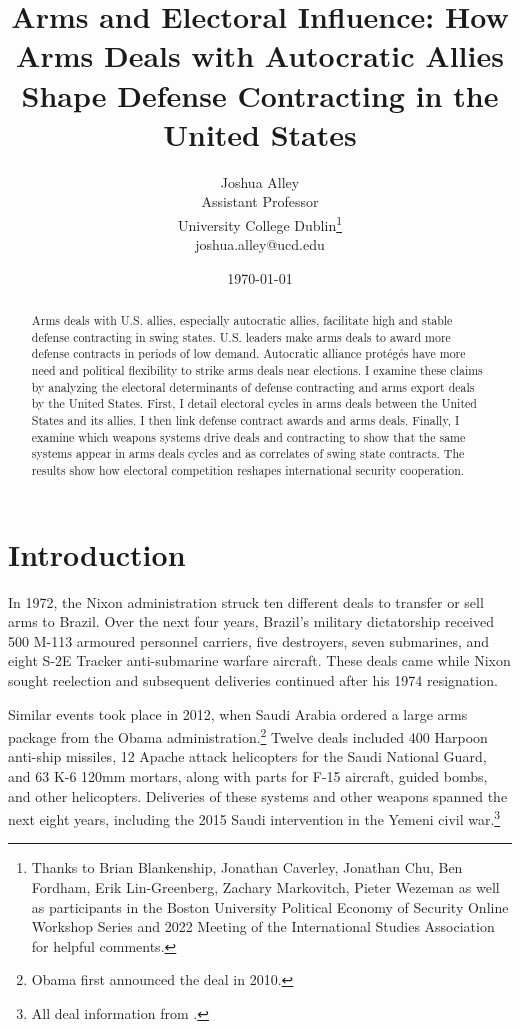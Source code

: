 \documentclass[12pt]{article}
\title{\textbf{Arms and Electoral Influence: How Arms Deals with Autocratic Allies Shape Defense Contracting in the United States}}
\author{Joshua Alley \\
Assistant Professor \\
University College Dublin\thanks{Thanks to Brian Blankenship, Jonathan Caverley, Jonathan Chu, Ben Fordham, Erik Lin-Greenberg, Zachary Markovitch, Pieter Wezeman as well as participants in the Boston University Political Economy of Security Online Workshop Series and 2022 Meeting of the International Studies Association for helpful comments.} \\
joshua.alley@ucd.edu
}
\date{\today}
\begin{document}
\maketitle 

\begin{abstract} 
Arms deals with U.S. allies, especially autocratic allies, facilitate high and stable defense contracting in swing states. 
U.S. leaders make arms deals to award more defense contracts in periods of low demand.
Autocratic alliance prot{\'e}g{\'e}s have more need and political flexibility to strike arms deals near elections. 
I examine these claims by analyzing the electoral determinants of defense contracting and arms export deals by the United States.  
First, I detail electoral cycles in arms deals between the United States and its allies. 
I then link defense contract awards and arms deals.
Finally, I examine which weapons systems drive deals and contracting to show that the same systems appear in arms deals cycles and as correlates of swing state contracts.  
The results show how electoral competition reshapes international security cooperation.
\end{abstract} 


\newpage 
\doublespace 


\section{Introduction}



In 1972, the Nixon administration struck ten different deals to transfer or sell arms to Brazil.
Over the next four years, Brazil's military dictatorship received 500 M-113 armoured personnel carriers, five destroyers, seven submarines, and eight S-2E Tracker anti-submarine warfare aircraft.
These deals came while Nixon sought reelection and subsequent deliveries continued after his 1974 resignation. 


Similar events took place in 2012, when Saudi Arabia ordered a large arms package from the Obama administration.\footnote{Obama first announced the deal in 2010.} 
Twelve deals included 400 Harpoon anti-ship missiles, 12 Apache attack helicopters for the Saudi National Guard, and 63 K-6 120mm mortars, along with parts for F-15 aircraft, guided bombs, and other helicopters. 
Deliveries of these systems and other weapons spanned the next eight years, including the 2015 Saudi intervention in the Yemeni civil war.\footnote{All deal information from \citep{Sipri2022}.}
\end{document}

